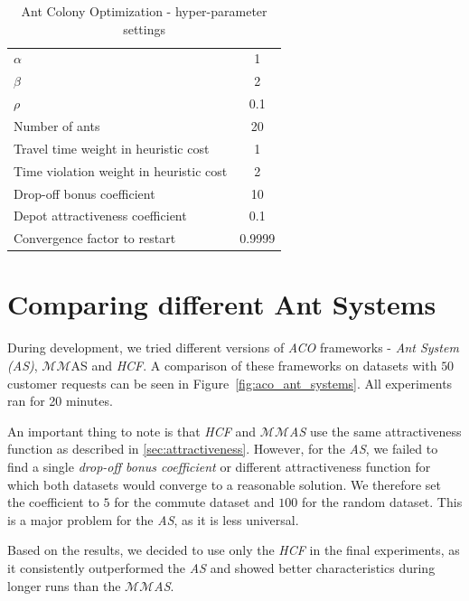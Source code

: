 \begin{table}
    \centering
    \begin{tabular}{lc}
        $\alpha$ & 1 \\
        $\beta$ & 2 \\
        $\rho$ & 0.1 \\
        Number of ants & 20 \\
        Travel time weight in heuristic cost & 1 \\
        Time violation weight in heuristic cost & 2 \\
        Drop-off bonus coefficient & 10 \\
        Depot attractiveness coefficient & 0.1 \\
        Convergence factor to restart & 0.9999
    \end{tabular}
    \caption{Ant Colony Optimization - hyper-parameter settings}
    \label{tab:aco_hyperparams}
\end{table}

\section{Comparing different Ant Systems}

During development, we tried different versions of \textit{ACO} frameworks - \textit{Ant System (AS)}\cite{Dorigo2010}, $\mathcal{MM}$AS\cite{STUTZLE2000889} and \textit{HCF}\cite{HCFMMAS}. A comparison of these frameworks on datasets with $50$ customer requests can be seen in Figure~\ref{fig:aco_ant_systems}. All experiments ran for 20 minutes.

An important thing to note is that \textit{HCF} and \textit{$\mathcal{MM}$AS} use the same attractiveness function as described in \ref{sec:attractiveness}. However, for the \textit{AS}, we failed to find a single \textit{drop-off bonus coefficient} or different attractiveness function for which both datasets would converge to a reasonable solution. We therefore set the coefficient to $5$ for the commute dataset and $100$ for the random dataset. This is a major problem for the \textit{AS}, as it is less universal.

Based on the results, we decided to use only the \textit{HCF} in the final experiments, as it consistently outperformed the \textit{AS} and showed better characteristics during longer runs than the \textit{$\mathcal{MM}$AS}.

